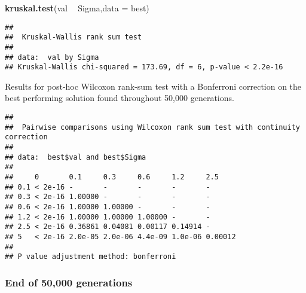 \documentclass[]{book}
\newenvironment{Shaded}{\begin{snugshade}}{\end{snugshade}}
\newcommand{\DataTypeTok}[1]{\textcolor[rgb]{0.13,0.29,0.53}{#1}}
\newcommand{\KeywordTok}[1]{\textcolor[rgb]{0.13,0.29,0.53}{\textbf{#1}}}
\newcommand{\NormalTok}[1]{#1}
\newcommand{\OperatorTok}[1]{\textcolor[rgb]{0.81,0.36,0.00}{\textbf{#1}}}
\newcommand{\OtherTok}[1]{\textcolor[rgb]{0.56,0.35,0.01}{#1}}
\newcommand{\StringTok}[1]{\textcolor[rgb]{0.31,0.60,0.02}{#1}}
\begin{document}
\begin{Shaded}
\begin{Highlighting}[]
\KeywordTok{kruskal.test}\NormalTok{(val }\OperatorTok{~}\StringTok{ }\NormalTok{Sigma,}\DataTypeTok{data =}\NormalTok{ best)}
\end{Highlighting}
\end{Shaded}

\begin{verbatim}
## 
##  Kruskal-Wallis rank sum test
## 
## data:  val by Sigma
## Kruskal-Wallis chi-squared = 173.69, df = 6, p-value < 2.2e-16
\end{verbatim}

Results for post-hoc Wilcoxon rank-sum test with a Bonferroni correction on the best performing solution found throughout 50,000 generations.

\begin{Shaded}
\end{Shaded}

\begin{verbatim}
## 
##  Pairwise comparisons using Wilcoxon rank sum test with continuity correction 
## 
## data:  best$val and best$Sigma 
## 
##     0       0.1     0.3     0.6     1.2     2.5    
## 0.1 < 2e-16 -       -       -       -       -      
## 0.3 < 2e-16 1.00000 -       -       -       -      
## 0.6 < 2e-16 1.00000 1.00000 -       -       -      
## 1.2 < 2e-16 1.00000 1.00000 1.00000 -       -      
## 2.5 < 2e-16 0.36861 0.04081 0.00117 0.14914 -      
## 5   < 2e-16 2.0e-05 2.0e-06 4.4e-09 1.0e-06 0.00012
## 
## P value adjustment method: bonferroni
\end{verbatim}

\hypertarget{end-of-50000-generations-24}{%
\subsubsection{End of 50,000 generations}\label{end-of-50000-generations-24}}
\end{document}
